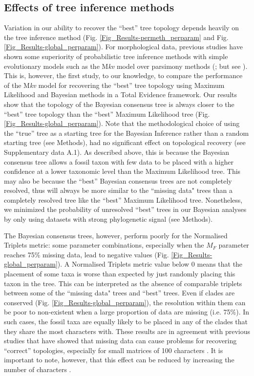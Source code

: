 \subsection{Effects of tree inference methods}
Variation in our ability to recover the ``best'' tree topology depends heavily on the tree inference method (Fig. \ref{Fig_Results-permeth_perparam} and Fig. \ref{Fig_Results-global_perparam}).
For morphological data, previous studies have shown some superiority of probabilistic tree inference methods with simple evolutionary models such as the M\textit{kv} model \citep{lewisa2001} over parsimony methods (\citealp{wrightbayesian2014}; but see \citealp{spencerefficacy2013}).
This is, however, the first study, to our knowledge, to compare the performance of the M\textit{kv} model \citep{lewisa2001} for recovering the ``best'' tree topology using Maximum Likelihood and Bayesian methods in a Total Evidence framework.
Our results show that the topology of the Bayesian consensus tree is always closer to the ``best'' tree topology than the ``best'' Maximum Likelihood tree (Fig. \ref{Fig_Results-global_perparam}).
Note that the methodological choice of using the ``true'' tree as a starting tree for the Bayesian Inference rather than a random starting tree (see Methods), had no significant effect on topological recovery (see Supplementary data A.1).
As described above, this is because the Bayesian consensus tree allows a fossil taxon with few data to be placed with a higher confidence at a lower taxonomic level than the Maximum Likelihood tree.
This may also be because the ``best'' Bayesian consensus trees are not completely resolved, thus will always be more similar to the ``missing data" trees than a completely resolved tree like the ``best'' Maximum Likelihood tree.
Nonetheless, we minimized the probability of unresolved ``best'' trees in our Bayesian analyses by only using datasets with strong phylogenetic signal (see Methods).

The Bayesian consensus trees, however, perform poorly for the Normalised Triplets metric: some parameter combinations, especially when the $M_F$ parameter reaches 75\% missing data, lead to negative values (Fig. \ref{Fig_Results-global_perparam}).
A Normalised Triplets metric value below 0 means that the placement of some taxa is worse than expected by just randomly placing this taxon in the tree.
This can be interpreted as the absence of comparable triplets between some of the ``missing data" trees and ``best'' trees.
Even if clades are conserved (Fig. \ref{Fig_Results-global_perparam}), the resolution within them can be poor to non-existent when a large proportion of data are missing (i.e. 75\%).
In such cases, the fossil taxa are equally likely to be placed in any of the clades that they share the most characters with.
These results are in agreement with previous studies that have showed that missing data can cause problems for recovering ``correct'' topologies, especially for small matrices of 100 characters \citep{wiensmissing2003}.
It is important to note, however, that this effect can be reduced by increasing the number of characters \citep{wiensmissing2003}.

